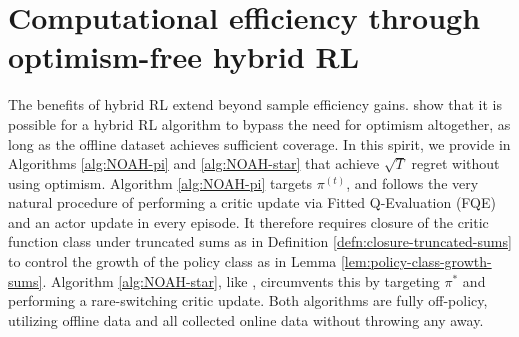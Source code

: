 

\section{Computational efficiency through optimism-free hybrid RL}

The benefits of hybrid RL extend beyond sample efficiency gains. \citet{song2023hybrid, amortila2024harnessing, zhou2023offline} show that it is possible for a hybrid RL algorithm to bypass the need for optimism altogether, as long as the offline dataset achieves sufficient coverage. In this spirit, we provide  in Algorithms \ref{alg:NOAH-pi} and \ref{alg:NOAH-star} that achieve $\sqrt{T}$ regret without using optimism. Algorithm \ref{alg:NOAH-pi} targets $\pi^{(t)}$, and follows the very natural procedure of performing a critic update via Fitted Q-Evaluation (FQE) \citep{munos2008finite} and an actor update in every episode. It therefore requires closure of the critic function class under truncated sums as in Definition \ref{defn:closure-truncated-sums} to control the growth of the policy class as in Lemma \ref{lem:policy-class-growth-sums}. Algorithm \ref{alg:NOAH-star}, like , circumvents this by targeting $\pi^*$ and performing a rare-switching critic update. Both algorithms are fully off-policy, utilizing offline data and all collected online data without throwing any away. 

